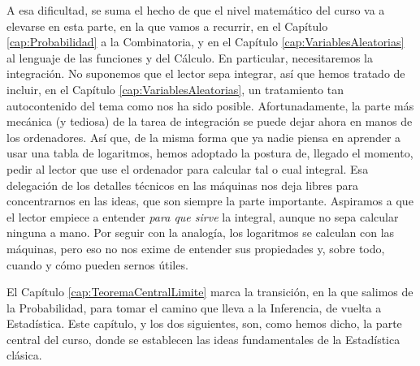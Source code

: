 A esa dificultad, se suma el hecho de que el nivel matemático del curso va a elevarse en esta
parte, en la que vamos a recurrir, en el Capítulo \ref{cap:Probabilidad} a la Combinatoria, y en el
Capítulo \ref{cap:VariablesAleatorias} al lenguaje de las funciones y del Cálculo. En particular,
necesitaremos la integración. No suponemos que el lector sepa integrar, así que hemos tratado de
incluir, en el Capítulo \ref{cap:VariablesAleatorias}, un tratamiento tan autocontenido del tema
como nos ha sido posible. Afortunadamente, la parte más mecánica (y tediosa) de la tarea de integración se 
puede dejar ahora en manos de los ordenadores. Así que, de la misma forma que ya
nadie piensa en aprender a usar una tabla de logaritmos, hemos adoptado la postura de, llegado el
momento, pedir al lector que use el ordenador para calcular tal o cual integral. Esa delegación de los detalles técnicos en las máquinas nos deja libres para concentrarnos en las ideas, que son siempre la parte importante. Aspiramos a que el lector empiece a entender {\em para que sirve} la integral, aunque no sepa calcular ninguna a mano. Por seguir con la analogía, los logaritmos se calculan con las máquinas, pero eso no nos exime de entender sus propiedades y, sobre todo, cuando y cómo pueden sernos útiles.

El Capítulo \ref{cap:TeoremaCentralLimite} marca la transición, en la que salimos de la
Probabilidad, para tomar el camino que lleva a la Inferencia, de vuelta a Estadística. Este
capítulo, y los dos siguientes, son, como hemos dicho, la parte central del curso, donde se
establecen las ideas fundamentales de la Estadística clásica.

